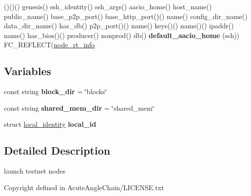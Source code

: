 \begin{DoxyCompactItemize}
\item 
\mbox{\label{programs_2aacio-launcher_2main_8cpp_ada979b90513f1c517828138f1f430212}} 
()()() genesis() ssh\+\_\+identity() ssh\+\_\+args() aacio\+\_\+home() host\+\_\+name() public\+\_\+name() base\+\_\+p2p\+\_\+port() base\+\_\+http\+\_\+port()() name() config\+\_\+dir\+\_\+name() data\+\_\+dir\+\_\+name() has\+\_\+db() p2p\+\_\+port()() name() keys()() name()() ipaddr() name() has\+\_\+bios()() producer() nonprod() db() {\bfseries default\+\_\+aacio\+\_\+home} (ssh)) F\+C\+\_\+\+R\+E\+F\+L\+E\+CT(\mbox{\hyperlink{structnode__rt__info}{node\+\_\+rt\+\_\+info}}
\end{DoxyCompactItemize}
\subsection*{Variables}
\begin{DoxyCompactItemize}
\item 
\mbox{\label{programs_2aacio-launcher_2main_8cpp_a3426d59b828f63d073d546fed967330e}} 
const string {\bfseries block\+\_\+dir} = \char`\"{}blocks\char`\"{}
\item 
\mbox{\label{programs_2aacio-launcher_2main_8cpp_a0995d763aebc677936adecfcde571807}} 
const string {\bfseries shared\+\_\+mem\+\_\+dir} = \char`\"{}shared\+\_\+mem\char`\"{}
\item 
\mbox{\label{programs_2aacio-launcher_2main_8cpp_a54777b040e000cc3ff116b93c6263977}} 
struct \mbox{\hyperlink{structlocal__identity}{local\+\_\+identity}} {\bfseries local\+\_\+id}
\end{DoxyCompactItemize}


\subsection{Detailed Description}
launch testnet nodes 

\begin{DoxyCopyright}{Copyright}
defined in Acute\+Angle\+Chain/\+L\+I\+C\+E\+N\+S\+E.\+txt 
\end{DoxyCopyright}
